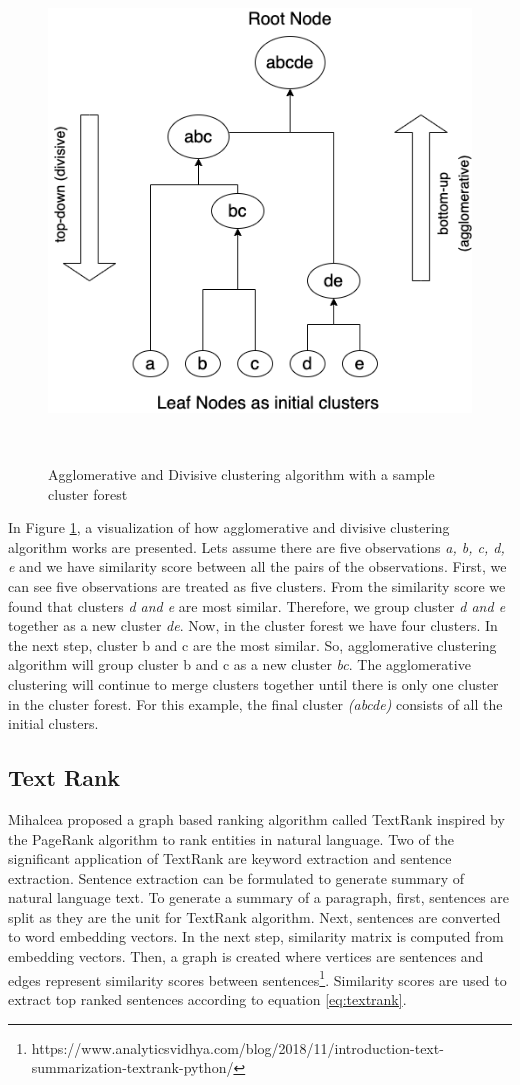\begin{figure}[h]
  \centering
  \includegraphics[width=0.5\columnwidth, height=0.5\columnwidth]{figures/background/agglomerative_clustering.png}
  \caption{Agglomerative and Divisive clustering algorithm with a sample cluster forest}~\label{fig:agglomerative_clustering}
\end{figure}
In Figure \ref{fig:agglomerative_clustering}, a visualization of how agglomerative and divisive clustering algorithm works are presented. Lets assume there are five observations \emph{a, b, c, d, e} and we have similarity score between all the pairs of the observations. First, we can see five observations are treated as five clusters. From the similarity score we found that clusters \emph{d and e} are most similar. Therefore, we group cluster \emph{d and e} together as a new cluster \emph{de}. Now, in the cluster forest we have four clusters. In the next step, cluster b and c are the most similar. So, agglomerative clustering algorithm will group cluster b and c as a new cluster \emph{bc}. The agglomerative clustering will continue to merge clusters together until there is only one cluster in the cluster forest. For this example, the final cluster \emph{(abcde)} consists of all the initial clusters. 

\subsection{Text Rank}
\label{background:text_rank}
Mihalcea \cite{mihalcea2004textrank} proposed a graph based ranking algorithm called TextRank inspired by the PageRank algorithm to rank entities in natural language. Two of the significant application of TextRank are keyword extraction and sentence extraction. Sentence extraction can be formulated to generate summary of natural language text. To generate a summary of a paragraph, first, sentences are split as they are the unit for TextRank algorithm. Next, sentences are converted to word embedding vectors. In the next step, similarity matrix is computed from embedding vectors. Then, a graph is created where vertices are sentences and edges represent similarity scores between sentences\footnote{https://www.analyticsvidhya.com/blog/2018/11/introduction-text-summarization-textrank-python/}. Similarity scores are used to extract top ranked sentences according to equation \ref{eq:textrank}.

